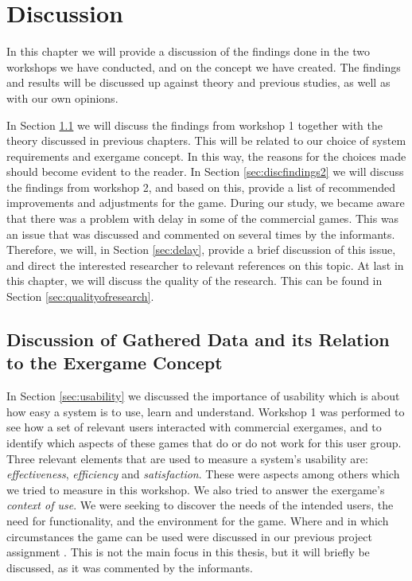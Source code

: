 \chapter{Discussion}
\label{chap:discussion}

In this chapter we will provide a discussion of the findings done in the two workshops we have conducted, and on the concept we have created. The findings and results will be discussed up against theory and previous studies, as well as with our own opinions. 

In Section \ref{sec:discfindings1} we will discuss the findings from workshop 1 together with the theory discussed in previous chapters. This will be related to our choice of system requirements and exergame concept. In this way, the reasons for the choices made should become evident to the reader. In Section \ref{sec:discfindings2} we will discuss the findings from workshop 2, and based on this, provide a list of recommended improvements and adjustments for the game. During our study, we became aware that there was a problem with delay in some of the commercial games. This was an issue that was discussed and commented on several times by the informants. Therefore, we will, in Section \ref{sec:delay}, provide a brief discussion of this issue, and direct the interested researcher to relevant references on this topic. At last in this chapter, we will discuss the quality of the research. This can be found in Section \ref{sec:qualityofresearch}. 

\section{Discussion of Gathered Data and its Relation to the Exergame Concept}
\label{sec:discfindings1}

In Section \ref{sec:usability} we discussed the importance of usability which is about how easy a system is to use, learn and understand. Workshop 1 was performed to see how a set of relevant users interacted with commercial exergames, and to identify which aspects of these games that do or do not work for this user group. Three relevant elements that are used to measure a system's usability are: \emph{effectiveness}, \emph{efficiency}  and \emph{satisfaction}. These were aspects among others which we tried to measure in this workshop. We also tried to answer the exergame's \emph{context of use}. We were seeking to discover the needs of the intended users, the need for functionality, and the environment for the game. Where and in which circumstances the game can be used were discussed in our previous project assignment \cite{project}. This is not the main focus in this thesis, but it will briefly be discussed, as it was commented by the informants.

